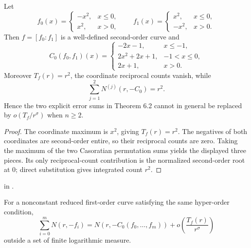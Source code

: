 \begin{example}
\leanok
{}
Let
\[
 f_0(x)=\begin{cases}-x^2,&x\leq0,\\x^2,&x>0,\end{cases}
 \qquad
 f_1(x)=\begin{cases}x^2,&x\leq0,\\-x^2,&x>0.\end{cases}
\]
Then $f=[f_0:f_1]$ is a well-defined second-order curve and
\[
 C_0(f_0,f_1)(x)=\begin{cases}
 -2x-1,&x\leq-1,\\
 2x^2+2x+1,&-1<x\leq0,\\
 2x+1,&x>0.
 \end{cases}
\]
Moreover $T_f(r)=r^2$, the coordinate reciprocal counts vanish, while
\[
                 \sum_{j=1}^2N^{(j)}(r,-C_0)=r^2.
\]
Hence the two explicit error sums in Theorem 6.2 cannot in general be
replaced by $o(T_f/r^\sigma)$ when $n\geq2$.
\end{example}

\begin{proof}
\leanok
The coordinate maximum is $x^2$, giving $T_f(r)=r^2$.  The negatives of both
coordinates are second-order entire, so their reciprocal counts are zero.
Taking the maximum of the two Casoratian permutation sums yields the displayed
three pieces.  Its only reciprocal-count contribution is the normalized
second-order root at $0$; direct substitution gives integrated count $r^2$.
\end{proof}

\begin{leanproof}
 in
.
\end{leanproof}

\begin{corollary}
\leanok
{}
For a nonconstant reduced first-order curve satisfying the same hyper-order
condition,
\[
 \sum_{i=0}^mN(r,-f_i)
 =N\!\left(r,-C_0(f_0,\ldots,f_m)\right)
 +o\!\left(\frac{T_f(r)}{r^\sigma}\right)
\]
outside a set of finite logarithmic measure.
\end{corollary}

